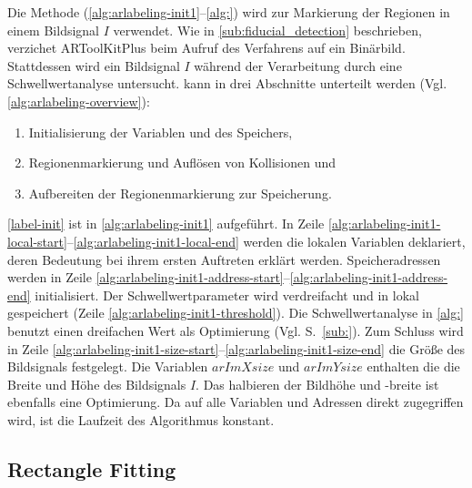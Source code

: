 Die Methode  (\autoref{alg:arlabeling-init1}--\autoref{alg:}) wird zur Markierung der Regionen in
 einem Bildsignal $I$ verwendet. Wie in \autoref{sub:fiducial_detection} beschrieben, verzichet ARToolKitPlus beim
 Aufruf des Verfahrens auf ein Binärbild. Stattdessen wird ein Bildsignal $I$ während der Verarbeitung durch eine
 Schwellwertanalyse untersucht.  kann in drei Abschnitte unterteilt werden
 (Vgl. \autoref{alg:arlabeling-overview}):

\begin{enumerate}
	\item Initialisierung der Variablen und des Speichers, \label{label-init}
	\item Regionenmarkierung und Auflösen von Kollisionen und \label{label-region}
	\item Aufbereiten der Regionenmarkierung zur Speicherung. \label{label-cleaning}
\end{enumerate}



\autoref{label-init} ist in \autoref{alg:arlabeling-init1} aufgeführt. In Zeile
 \ref{alg:arlabeling-init1-local-start}--\ref{alg:arlabeling-init1-local-end} werden die lokalen Variablen deklariert,
 deren Bedeutung bei ihrem ersten Auftreten erklärt werden. Speicheradressen werden in Zeile
 \ref{alg:arlabeling-init1-address-start}--\ref{alg:arlabeling-init1-address-end} initialisiert. Der
 Schwellwertparameter wird verdreifacht und in lokal gespeichert (Zeile \ref{alg:arlabeling-init1-threshold}). Die
 Schwellwertanalyse in \autoref{alg:} benutzt einen dreifachen Wert als Optimierung
 (Vgl. S.~\autoref{sub:}). Zum Schluss wird in Zeile
 \ref{alg:arlabeling-init1-size-start}--\ref{alg:arlabeling-init1-size-end} die Größe des Bildsignals festgelegt. Die
 Variablen $\mathit{arImXsize}$ und $\mathit{arImYsize}$ enthalten die die Breite und Höhe des Bildsignals $I$. Das
 halbieren der Bildhöhe und -breite ist ebenfalls eine Optimierung. Da auf alle Variablen und Adressen direkt
 zugegriffen wird, ist die Laufzeit des Algorithmus konstant.




\subsection{Rectangle Fitting} %
\label{sec:rectangle_fitting}



